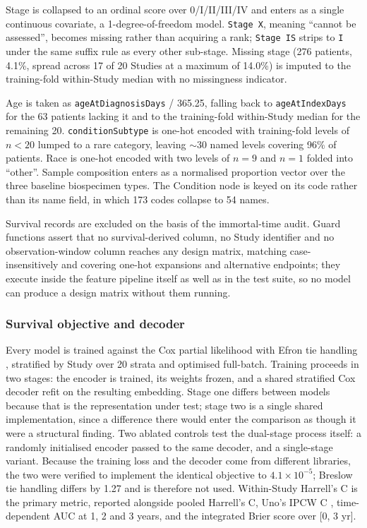 Stage is collapsed to an ordinal score over 0/I/II/III/IV and enters as a single continuous covariate, a 1-degree-of-freedom model. \texttt{Stage X}, meaning ``cannot be assessed'', becomes missing rather than acquiring a rank; \texttt{Stage IS} strips to \texttt{I} under the same suffix rule as every other sub-stage. Missing stage (276 patients, 4.1\%, spread across 17 of 20 Studies at a maximum of 14.0\%) is imputed to the training-fold within-Study median with no missingness indicator.

Age is taken as \texttt{ageAtDiagnosisDays} / 365.25, falling back to \texttt{ageAtIndexDays} for the 63 patients lacking it and to the training-fold within-Study median for the remaining 20. \texttt{conditionSubtype} is one-hot encoded with training-fold levels of $n < 20$ lumped to a rare category, leaving $\sim$30 named levels covering 96\% of patients. Race is one-hot encoded with two levels of $n = 9$ and $n = 1$ folded into ``other''. Sample composition enters as a normalised proportion vector over the three baseline biospecimen types. The Condition node is keyed on its code rather than its name field, in which 173 codes collapse to 54 names.

Survival records are excluded on the basis of the immortal-time audit. Guard functions assert that no survival-derived column, no Study identifier and no observation-window column reaches any design matrix, matching case-insensitively and covering one-hot expansions and alternative endpoints; they execute inside the feature pipeline itself as well as in the test suite, so no model can produce a design matrix without them running.

\subsubsection{Survival objective and decoder}

Every model is trained against the Cox partial likelihood \cite{cox1972} with Efron tie handling \cite{efron1977}, stratified by Study over 20 strata and optimised full-batch. Training proceeds in two stages: the encoder is trained, its weights frozen, and a shared stratified Cox decoder refit on the resulting embedding. Stage one differs between models because that is the representation under test; stage two is a single shared implementation, since a difference there would enter the comparison as though it were a structural finding. Two ablated controls test the dual-stage process itself: a randomly initialised encoder passed to the same decoder, and a single-stage variant. Because the training loss and the decoder come from different libraries, the two were verified to implement the identical objective to $4.1 \times 10^{-5}$; Breslow tie handling differs by 1.27 and is therefore not used. Within-Study Harrell's C \cite{harrell1982} is the primary metric, reported alongside pooled Harrell's C, Uno's IPCW C \cite{uno2011}, time-dependent AUC at 1, 2 and 3 years, and the integrated Brier score \cite{graf1999} over [0, 3 yr].

